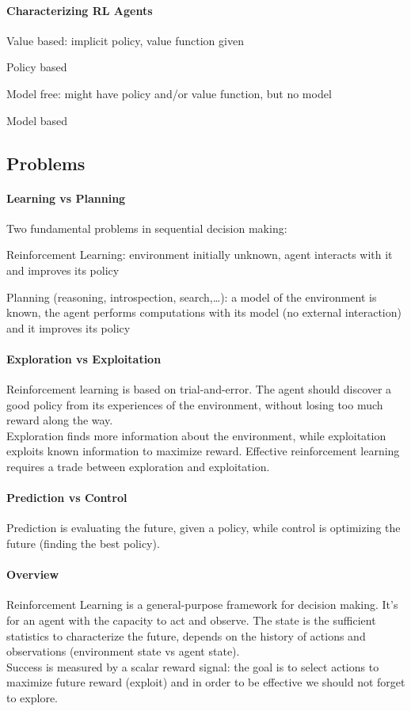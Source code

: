 \documentclass[10pt]{report}
\begin{document}
\paragraph{Characterizing RL Agents}\begin{list}{}{}
	\item Value based: implicit policy, value function given
	\item Policy based
	\item Model free: might have policy and/or value function, but no model
	\item Model based
\end{list}
\subsection{Problems}
\paragraph{Learning vs Planning} Two fundamental problems in sequential decision making:
\begin{list}{}{}
	\item Reinforcement Learning: environment initially unknown, agent interacts with it and improves its policy
	\item Planning (reasoning, introspection, search,\ldots): a model of the environment is known, the agent performs computations with its model (no external interaction) and it improves its policy
\end{list}
\paragraph{Exploration vs Exploitation} Reinforcement learning is based on trial-and-error. The agent should discover a good policy from its experiences of the environment, without losing too much reward along the way.\\
Exploration finds more information about the environment, while exploitation exploits known information to maximize reward. Effective reinforcement learning requires a trade between exploration and exploitation.
\paragraph{Prediction vs Control} Prediction is evaluating the future, given a policy, while control is optimizing the future (finding the best policy).
\paragraph{Overview} Reinforcement Learning is a general-purpose framework for decision making. It's for an agent with the capacity to act and observe. The state is the sufficient statistics to characterize the future, depends on the history of actions and observations (environment state vs agent state).\\
Success is measured by a scalar reward signal: the goal is to select actions to maximize future reward (exploit) and in order to be effective we should not forget to explore.
\end{document}
